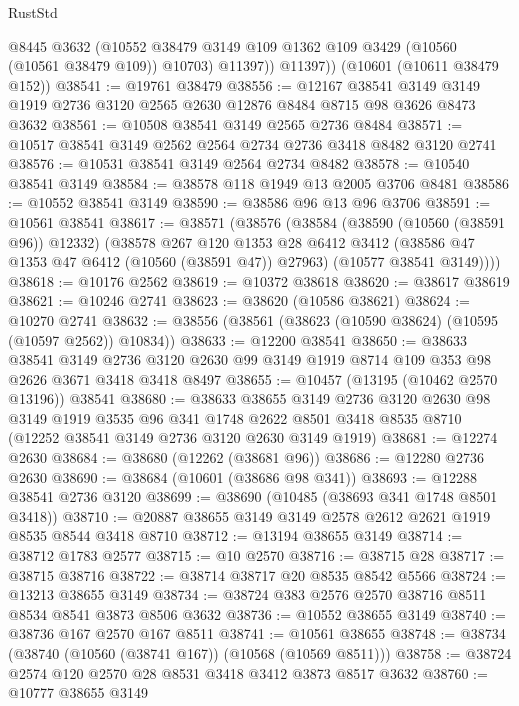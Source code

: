 \begin{lexlean}{RustStd}
\begin{coremodule}
            @8445
            @3632
            (@10552 @38479 @3149 @109 @1362 @109 @3429 (@10560 (@10561 @38479 @109)) @10703)
            @11397))
        @11397))
    (@10601 (@10611 @38479 @152))
@38541 := @19761 @38479
@38556 := @12167
    @38541
    @3149
    @3149
    @1919
    @2736
    @3120
    @2565
    @2630
    @12876
    @8484
    @8715
    @98
    @3626
    @8473
    @3632
@38561 := @10508 @38541 @3149 @2565 @2736 @8484
@38571 := @10517 @38541 @3149 @2562 @2564 @2734 @2736 @3418 @8482 @3120 @2741
@38576 := @10531 @38541 @3149 @2564 @2734 @8482
@38578 := @10540 @38541 @3149
@38584 := @38578 @118 @1949 @13 @2005 @3706 @8481
@38586 := @10552 @38541 @3149
@38590 := @38586 @96 @13 @96 @3706
@38591 := @10561 @38541
@38617 := @38571
    (@38576
      (@38584
        (@38590 (@10560 (@38591 @96)) @12332)
        (@38578
          @267
          @120
          @1353
          @28
          @6412
          @3412
          (@38586 @47 @1353 @47 @6412 (@10560 (@38591 @47)) @27963)
          (@10577 @38541 @3149))))
@38618 := @10176 @2562
@38619 := @10372 @38618
@38620 := @38617 @38619
@38621 := @10246 @2741
@38623 := @38620 (@10586 @38621)
@38624 := @10270 @2741
@38632 := @38556 (@38561 (@38623 (@10590 @38624) (@10595 (@10597 @2562)) @10834))
@38633 := @12200 @38541
@38650 := @38633
    @38541
    @3149
    @2736
    @3120
    @2630
    @99
    @3149
    @1919
    @8714
    @109
    @353
    @98
    @2626
    @3671
    @3418
    @3418
    @8497
@38655 := @10457 (@13195 (@10462 @2570 @13196)) @38541
@38680 := @38633
    @38655
    @3149
    @2736
    @3120
    @2630
    @98
    @3149
    @1919
    @3535
    @96
    @341
    @1748
    @2622
    @8501
    @3418
    @8535
    @8710
    (@12252 @38541 @3149 @2736 @3120 @2630 @3149 @1919)
@38681 := @12274 @2630
@38684 := @38680 (@12262 (@38681 @96))
@38686 := @12280 @2736 @2630
@38690 := @38684 (@10601 (@38686 @98 @341))
@38693 := @12288 @38541 @2736 @3120
@38699 := @38690 (@10485 (@38693 @341 @1748 @8501 @3418))
@38710 := @20887 @38655 @3149 @3149 @2578 @2612 @2621 @1919 @8535 @8544 @3418 @8710
@38712 := @13194 @38655 @3149
@38714 := @38712 @1783 @2577
@38715 := @10 @2570
@38716 := @38715 @28
@38717 := @38715 @38716
@38722 := @38714 @38717 @20 @8535 @8542 @5566
@38724 := @13213 @38655 @3149
@38734 := @38724 @383 @2576 @2570 @38716 @8511 @8534 @8541 @3873 @8506 @3632
@38736 := @10552 @38655 @3149
@38740 := @38736 @167 @2570 @167 @8511
@38741 := @10561 @38655
@38748 := @38734 (@38740 (@10560 (@38741 @167)) (@10568 (@10569 @8511)))
@38758 := @38724 @2574 @120 @2570 @28 @8531 @3418 @3412 @3873 @8517 @3632
@38760 := @10777 @38655 @3149

\end{coremodule}
\end{lexlean}
